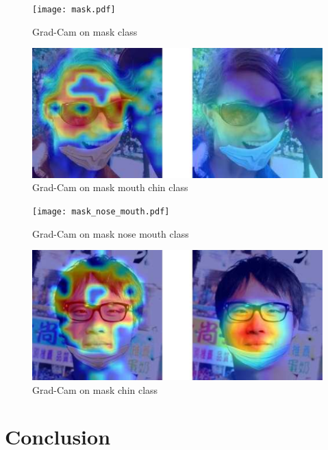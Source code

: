 \documentclass{article}
\begin{document}
\begin{figure}[!b]
	\centering
	\texttt{[image: mask.pdf]}
	\caption{Grad-Cam on mask class}
	\label{mask}
\end{figure}

\begin{figure}[!b]
	\centering
	\includegraphics[scale=.015]{mask_mouth_chin.pdf}
	\caption{Grad-Cam on mask mouth chin class}
	\label{mask_mouth_chin}
\end{figure}


\begin{figure}[!b]
	\centering
	\texttt{[image: mask\_nose\_mouth.pdf]}
	\caption{Grad-Cam on mask nose mouth class}
	\label{mask_nose_mouth}
\end{figure}

\begin{figure}[!b]
	\centering
	\includegraphics[scale=.015]{mask_chin.pdf}
	\caption{Grad-Cam on mask chin class}
	\label{mask_chin}
\end{figure}


\section{Conclusion}
\end{document}
